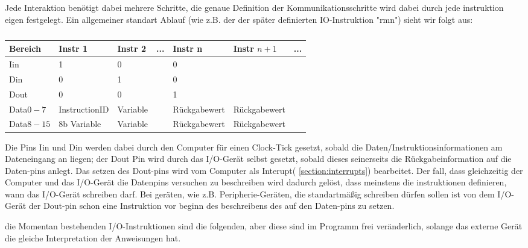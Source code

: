 \documentclass{scrartcl}
\begin{document}
Jede Interaktion benötigt dabei mehrere Schritte, die genaue Definition der Kommunikationsschritte wird dabei durch jede instruktion eigen festgelegt.
Ein allgemeiner standart Ablauf (wie z.B. der der später definierten IO-Instruktion "rmn") sieht wir folgt aus:

\begin{center}
	\begin{table}[h]
		\caption{\label{table:IO_Schem}}
		\begin{tabular}{l | l | l | l | l | l | l}
			 Bereich & Instr 1 & Instr 2 & ... & Instr n & Instr $n+1$ & ... \\
			\hline
			Iin & 1 & 0 &   & 0 & \\
			Din & 0 & 1 &   & 0 & \\
			Dout & 0 & 0 &   & 1 & \\
			Data$0-7$ & InstructionID & Variable &   & Rückgabewert & Rückgabewert \\
			Data$8-15$ & 8b Variable & Variable &   & Rückgabewert & Rückgabewert
 		\end{tabular}
	\end{table}
\end{center}

Die Pins Iin und Din werden dabei durch den Computer für einen Clock-Tick gesetzt, sobald die Daten/Instruktionsinformationen am Dateneingang an liegen; der Dout Pin wird durch das I/O-Gerät selbst gesetzt, sobald dieses seinerseits die Rückgabeinformation auf die Daten-pins anlegt.
Das setzen des Dout-pins wird vom Computer als Interupt( \autoref{section:interrupts}) bearbeitet.
Der fall, dass gleichzeitig der Computer und das I/O-Gerät die Datenpins versuchen zu beschreiben wird dadurch gelöst, dass meinstens die instruktionen definieren, wann das I/O-Gerät schreiben darf. Bei geräten, wie z.B. Peripherie-Geräten, die standartmäßig schreiben dürfen sollen ist von dem I/O-Gerät der Dout-pin schon eine Instruktion vor beginn des beschreibens des auf den Daten-pins zu setzen.

die Momentan bestehenden I/O-Instruktionen sind die folgenden, aber diese sind im Programm frei veränderlich, solange das externe Gerät die gleiche Interpretation der Anweisungen hat.
\end{document}
